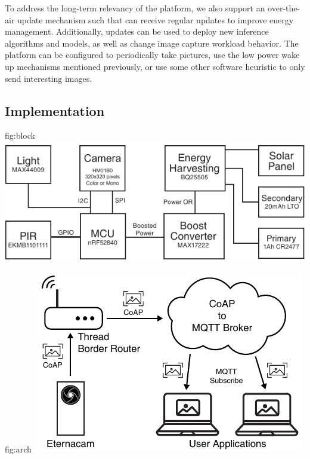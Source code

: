 To address the long-term relevancy of the platform, we also support an over-the-air update mechanism such that \namec can receive regular updates to improve energy management. Additionally, updates can be used to deploy new inference algorithms and models, as well as change image capture workload behavior. The platform can be configured to periodically take pictures, use the low power wake up mechanisms mentioned previously, or use some other software heuristic to only send interesting images.

\subsection{\namec Implementation}
\begin{definefigure}{fig:block}
\includegraphics[width=\columnwidth]{figs/permacam/figs/block_diagram.pdf}
\caption{\name system block diagram.
The system is based on the Himax HM01B0 camera and the Nordic NRF52840 MCU. We include a light and PIR sensor to provide a low power wake up mechanism to drive image capture. A hierarchical energy harvesting system with a rechargeable and non-rechargeable battery are utilized to provide a long, reliable lifetime to the system.
}
\end{definefigure}

\begin{definefigure}{fig:arch}
\includegraphics[width=0.85\columnwidth]{figs/permacam/figs/arch.pdf}
\caption{The \namec end-to-end image transfer architecture. \namec uses OpenThread, a 6LoWPAN network. This allows it to transmit images over the CoAP block protocol directly to any IP endpoint. We implement a CoAP server to receive and reassemble image, demosaic them, and publish them over an MQTT stream. This CoAP server can be local to the sensors if privacy is desired. User applications running on PCs or on servers can easily subscribe to incoming images.
\hl{TODO: reformat image, make smaller}}
\end{definefigure}

